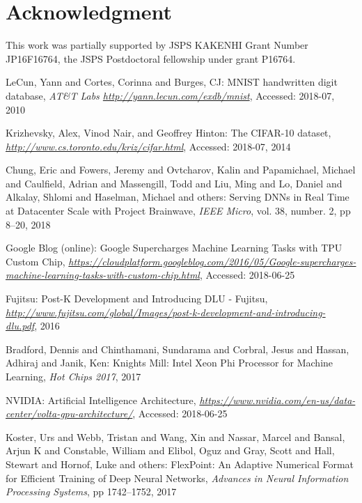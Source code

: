 \documentclass[techrep,english]{ipsj} %
\begin{document}
\section{Acknowledgment}\label{sec:acknowledgment}
This work was partially supported by JSPS KAKENHI Grant Number JP16F16764, the JSPS Postdoctoral fellowship under grant P16764.

\begin{thebibliography}{99}

  LeCun, Yann and Cortes, Corinna and Burges, CJ:
  MNIST handwritten digit database,
  {\it AT\&T Labs \url{http://yann.lecun.com/exdb/mnist}},
  Accessed: 2018-07, 2010

  Krizhevsky, Alex, Vinod Nair, and Geoffrey Hinton:
  The CIFAR-10 dataset,
  {\it \url{http://www.cs.toronto.edu/kriz/cifar.html}},
  Accessed: 2018-07, 2014

  Chung, Eric and Fowers, Jeremy and Ovtcharov, Kalin and Papamichael, Michael and Caulfield, Adrian and Massengill, Todd and Liu, Ming and Lo, Daniel and Alkalay, Shlomi and Haselman, Michael and others:
  Serving DNNs in Real Time at Datacenter Scale with Project Brainwave,
  {\it IEEE Micro},
  vol. 38, number. 2, pp 8--20, 2018

  Google Blog (online):
  Google Supercharges Machine Learning Tasks with TPU Custom Chip,
  {\it \url{https://cloudplatform.googleblog.com/2016/05/Google-supercharges-machine-learning-tasks-with-custom-chip.html}},
  Accessed: 2018-06-25

  Fujitsu:
  Post-K Development and Introducing DLU - Fujitsu,
  {\it \url{http://www.fujitsu.com/global/Images/post-k-development-and-introducing-dlu.pdf}},
  2016

  Bradford, Dennis and Chinthamani, Sundarama and Corbral, Jesus and Hassan, Adhiraj and Janik, Ken:
  Knights Mill: Intel Xeon Phi Processor for Machine Learning,
  {\it Hot Chips 2017},
  2017
  
  NVIDIA:
  Artificial Intelligence Architecture,
  {\it \url{https://www.nvidia.com/en-us/data-center/volta-gpu-architecture/}},
  Accessed: 2018-06-25

  Koster, Urs and Webb, Tristan and Wang, Xin and Nassar, Marcel and Bansal, Arjun K and Constable, William and Elibol, Oguz and Gray, Scott and Hall, Stewart and Hornof, Luke and others:
  FlexPoint: An Adaptive Numerical Format for Efficient Training of Deep Neural Networks,
  {\it Advances in Neural Information Processing Systems},
  pp 1742--1752, 2017


\end{thebibliography}
\end{document}
